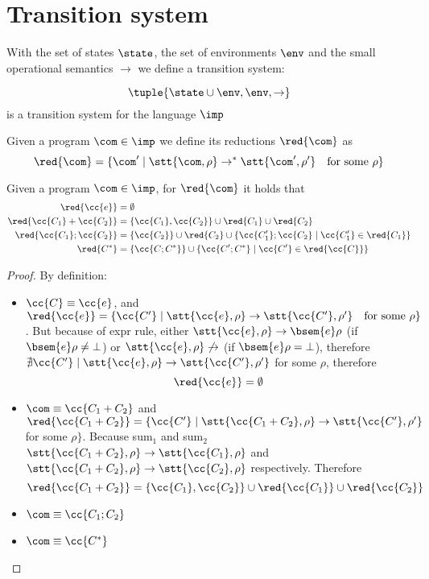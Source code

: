 \section{Transition system}

With the set of states \(\state\), the set of environments \(\env\)
and the small operational semantics \(\to\) we define a transition
system:

\begin{definition}
  \[\tuple{\state \cup \env, \env, \to}\] is a transition system for
  the language \(\imp\)
\end{definition}

\begin{definition}[Reductions]
  Given a program \(\com\in\imp\) we define its reductions
  \(\red{\com}\) as \[\red{\com} = \{\com' \mid \stt{\com, \rho} \to^*
  \stt{\com', \rho'} \quad \text{for some } \rho\}\]
\end{definition}

\begin{lemma}\label{le:tosets}
  Given a program \(\com\in\imp\), for \(\red{\com}\) it holds that
  \begin{align*}
    \red{\cc{e}} & = \emptyset \\
    \red{\cc{C_1} + \cc{C_2}} & = \{\cc{C_1}, \cc{C_2}\}\cup\red{C_1}\cup\red{C_2} \\
    \red{\cc{C_1};\cc{C_2}} & = \{\cc{C_2}\}\cup\red{C_2}\cup\{\cc{C_1'};\cc{C_2} \mid \cc{C_1'}\in\red{C_1}\} \\
    \red{C^*} & = \{\cc{C;C^*}\} \cup \{\cc{C';C^*} \mid \cc{C'}\in\red{\cc{C}}\}
  \end{align*}
\end{lemma}

\begin{proof}
  By definition:
  \begin{itemize}
  \item \(\cc{C}\equiv \cc{e}\), and \(\red{\cc{e}} = \{\cc{C'} \mid
    \stt{\cc{e}, \rho} \to \stt{\cc{C'}, \rho'} \quad \text{for some }
    \rho\}\). But because of expr rule, either \(\stt{\cc{e}, \rho}
    \to \bsem{e}\rho\) (if \(\bsem{e}\rho \neq \bot\)) or
    \(\stt{\cc{e}, \rho} \not\to\) (if \(\bsem{e}\rho = \bot\)),
    therefore \(\nexists \cc{C'} \mid \stt{\cc{e}, \rho} \to
    \stt{\cc{C'}, \rho'}\) for some \(\rho\), therefore \[\red{\cc{e}}
    = \emptyset\]
  \item \(\com \equiv \cc{C_1 + C_2}\) and \(\red{\cc{C_1 + C_2}} =
    \{\cc{C'} \mid \stt{\cc{C_1 + C_2}, \rho} \to \stt{\cc{C'},
      \rho'}\) for some \(\rho\}\). Because sum\(_1\) and sum\(_2\)
    \(\stt{\cc{C_1 + C_2}, \rho} \to \stt{\cc{C_1}, \rho}\) and
    \(\stt{\cc{C_1 + C_2}, \rho} \to \stt{\cc{C_2}, \rho}\)
    respectively. Therefore \[\red{\cc{C_1 + C_2}} = \{\cc{C_1},
    \cc{C_2}\}\cup \red{\cc{C_1}} \cup \red{\cc{C_2}}\]
  \item \(\com \equiv \cc{C_1;C_2}\)
  \item \(\com \equiv \cc{C^*}\)
  \end{itemize}
\end{proof}

